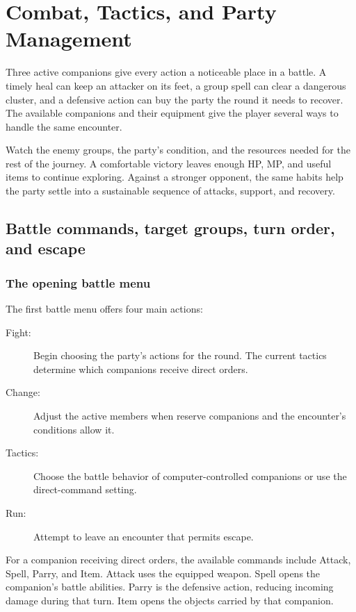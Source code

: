\chapter{Combat, Tactics, and Party Management}
\label{written-combat}

Three active companions give every action a noticeable place in a battle.
A timely heal can keep an attacker on its feet, a group spell can clear a
dangerous cluster, and a defensive action can buy the party the round it
needs to recover. The available companions and their equipment give the
player several ways to handle the same encounter.

Watch the enemy groups, the party's condition, and the resources needed
for the rest of the journey. A comfortable victory leaves enough HP, MP,
and useful items to continue exploring. Against a stronger opponent, the
same habits help the party settle into a sustainable sequence of attacks,
support, and recovery.

\section{Battle commands, target groups, turn order, and escape}

\subsection*{The opening battle menu}

The first battle menu offers four main actions:
\begin{description}
  \item[Fight:] Begin choosing the party's actions for the round. The
    current tactics determine which companions receive direct orders.
  \item[Change:] Adjust the active members when reserve companions and
    the encounter's conditions allow it.
  \item[Tactics:] Choose the battle behavior of computer-controlled
    companions or use the direct-command setting.
  \item[Run:] Attempt to leave an encounter that permits escape.
\end{description}

For a companion receiving direct orders, the available commands include
Attack, Spell, Parry, and Item. Attack uses the equipped weapon. Spell
opens the companion's battle abilities. Parry is the defensive action,
reducing incoming damage during that turn. Item opens the objects carried
by that companion.

